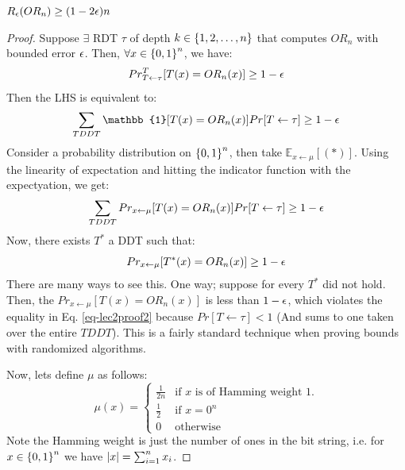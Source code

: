 \begin{propbox}{}
    $R_{\epsilon}(OR_n) \geq (1-2\epsilon)n$
\end{propbox}
\begin{proof}
    Suppose $\exists$ RDT $\tau$ of depth $k \in \set{1, 2, \ldots, n}$ that computes $OR_n$ with bounded error $\epsilon$. Then, $\forall x \in \set{0, 1}^n$, we have:
    \begin{equation}
        Pr^T_{T \leftarrow \tau}[T(x) = OR_n(x)] \geq 1-\epsilon
    \end{equation}
    Then the LHS is equivalent to:
    \begin{equation}
        \sum_{TDDT}\mathbb{1}[T(x) = OR_n(x)] Pr[T \leftarrow \tau] \geq 1 - \e
    \end{equation}
    Consider a probability distribution on $\set{0, 1}^n$, then take $\mathbb{E}_{x \leftarrow \mu}[(*)]$. Using the linearity of expectation and hitting the indicator function with the expectyation, we get:
    \begin{equation}\label{eq-lec2proof2}
        \sum_{TDDT}Pr_{x \leftarrow \mu}[T(x) = OR_n(x)]Pr[T \leftarrow \tau] \geq 1 - \epsilon
    \end{equation}
    Now, there exists $T^*$ a DDT such that:
    \begin{equation}
        Pr_{x \leftarrow \mu}[T^*(x) = OR_n(x)] \geq 1 - \epsilon
    \end{equation}
    There are many ways to see this. One way; suppose for every $T^*$ did not hold. Then, the $Pr_{x \leftarrow \mu}[T(x) = OR_n(x)]$ is less than $1 - \epsilon$, which violates the equality in Eq. \eqref{eq-lec2proof2} because $Pr[T \leftarrow \tau] < 1$ (And sums to one taken over the entire $TDDT$). This is a fairly standard technique when proving bounds with randomized algorithms.
    
    Now, lets define $\mu$ as follows:
    \begin{equation}
        \mu(x) = \begin{cases}
            \frac{1}{2n} & \text{if $x$ is of Hamming weight 1.}
            \\ \frac{1}{2} & \text{if } x = 0^n
            \\ 0 & \text{otherwise}
        \end{cases}
    \end{equation}
    Note the Hamming weight is just the number of ones in the bit string, i.e. for $x \in \set{0, 1}^n$ we have $\lvert x \rvert = \sum_{i=1}^n x_i$. 


\end{proof}
